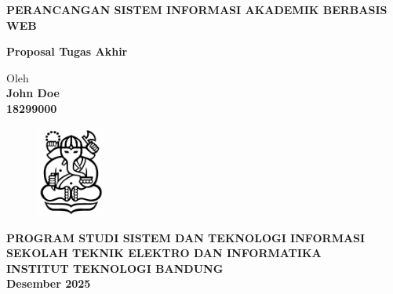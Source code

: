 \documentclass[12pt,a4paper,oneside]{book}
\begin{document}
\begin{titlepage}
\begin{center}

    
    \vspace*{2cm}
    
    {\Large\bfseries PERANCANGAN SISTEM INFORMASI AKADEMIK BERBASIS WEB}\\
     \vspace{4cm}

    {\Large \textbf{Proposal Tugas Akhir}}\\


    \vspace{2cm}
    
    
    {\large Oleh}\\[0.3cm]
    \textbf{
    {\large John Doe}\\
    {\large 18299000}
    }\\

    \vspace{2cm}
    
    \begin{figure}[h]
    \centering
    \includegraphics[width=0.2\textwidth]{ganesha.jpg}
    \end{figure}
    
    
    \vfill

    \textbf{
    {\large PROGRAM STUDI SISTEM DAN TEKNOLOGI INFORMASI}\\
    {\large SEKOLAH TEKNIK ELEKTRO DAN INFORMATIKA}\\
    {\large INSTITUT TEKNOLOGI BANDUNG}\\
    {\large Desember 2025}
    }
\end{center}
\end{titlepage}
\end{document}
